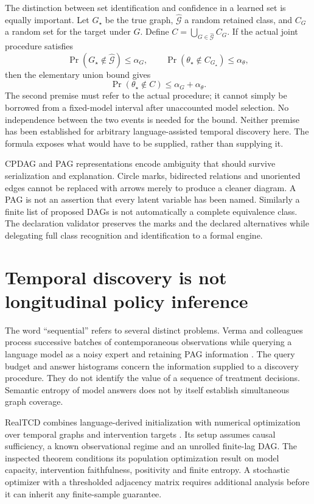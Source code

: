 The distinction between set identification and confidence in a learned set is
equally important. Let $G_\star$ be the true graph, $\widehat{\mathcal G}$ a
random retained class, and $C_G$ a random set for the target under $G$. Define
$C=\bigcup_{G\in\widehat{\mathcal G}}C_G$. If the actual joint procedure
satisfies
\[
 \Pr(G_\star\notin\widehat{\mathcal G})\le\alpha_G,
 \qquad
 \Pr(\theta_\star\notin C_{G_\star})\le\alpha_\theta,
\]
then the elementary union bound gives
\begin{equation}
 \Pr(\theta_\star\notin C)\le\alpha_G+\alpha_\theta.
 \label{eq:la03-coverage-decomposition}
\end{equation}
The second premise must refer to the actual procedure; it cannot simply be
borrowed from a fixed-model interval after unaccounted model selection. No
independence between the two events is needed for the bound. Neither premise
has been established for arbitrary language-assisted temporal discovery here.
The formula exposes what would have to be supplied, rather than supplying it.

CPDAG and PAG representations encode ambiguity that should survive
serialization and explanation. Circle marks, bidirected relations and
unoriented edges cannot be replaced with arrows merely to produce a cleaner
diagram. A PAG is not an assertion that every latent variable has been named.
Similarly a finite list of proposed DAGs is not automatically a complete
equivalence class. The declaration validator preserves the marks and the
declared alternatives while delegating full class recognition and
identification to a formal engine.

\section{Temporal discovery is not longitudinal policy inference}

The word ``sequential'' refers to several distinct problems. Verma and
colleagues process successive batches of contemporaneous observations while
querying a language model as a noisy expert and retaining PAG information
\citep{v12_la_2506_16234}. The query budget and answer histograms concern
the information supplied to a discovery procedure. They do not identify the
value of a sequence of treatment decisions. Semantic entropy of model answers
does not by itself establish simultaneous graph coverage.

RealTCD combines language-derived initialization with numerical optimization
over temporal graphs and intervention targets
\citep{v12_la_2404_14786}. Its setup assumes causal sufficiency, a known
observational regime and an unrolled finite-lag DAG. The inspected theorem
conditions its population optimization result on model capacity, intervention
faithfulness, positivity and finite entropy. A stochastic optimizer with a
thresholded adjacency matrix requires additional analysis before it can inherit
any finite-sample guarantee.

